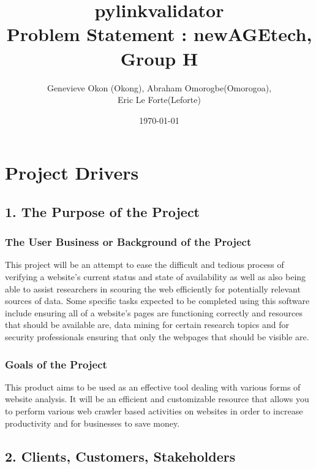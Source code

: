 \documentclass[titlepage]{article}
\begin{document}
\title{pylinkvalidator \\
 Problem Statement : newAGEtech, Group H }
\author{Genevieve Okon (Okong), Abraham Omorogbe(Omorogoa),\\
 Eric Le Forte(Leforte)}
\date{\today}
\maketitle


\tableofcontents
\listoffigures
\listoftables
\clearpage

\section{Project Drivers}

\subsection{1. The Purpose of the Project}

\subsubsection*{The User Business or Background of the Project}
This project will be an attempt to ease the difficult and tedious process of verifying a website’s current status and state of availability as well as also being able to assist researchers in scouring the web efficiently for potentially relevant sources of data. Some specific tasks expected to be completed using this software include ensuring all of a website’s pages are functioning correctly and resources that should be available are, data mining for certain research topics and for security professionals ensuring that only the webpages that should be visible are.

\subsubsection*{Goals of the Project}
This product aims to be used as an effective tool dealing with various forms of website analysis. It will be an efficient and customizable resource that allows you to perform various web crawler based activities on websites in order to increase productivity and for businesses to save money.


\subsection{2. Clients, Customers, Stakeholders}
\end{document}
